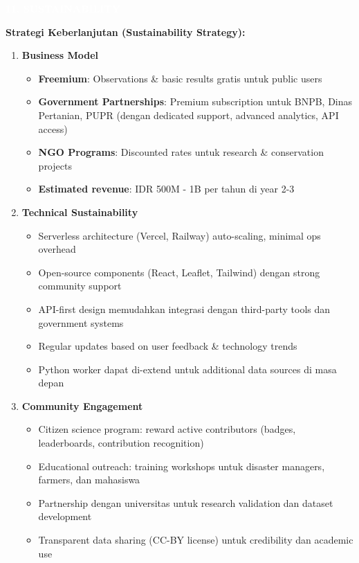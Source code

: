 \documentclass[12pt,a4paper]{article}
\newcommand{\sectionbox}[1]{%
  \colorbox{samsungblue}{%
    \parbox{\textwidth}{%
      \textcolor{white}{\large\bfseries #1}%
    }%
  }%
}
\newcommand{\subsectionbox}[1]{%
  \textbf{\large #1}\\[0.3cm]
}
\begin{document}
\vspace{1cm}

\sectionbox{11. SUSTAINABILITY}

\vspace{0.5cm}

\subsectionbox{Strategi Keberlanjutan (Sustainability Strategy):}

\begin{enumerate}
  \item \textbf{Business Model}
  \begin{itemize}
    \item \textbf{Freemium}: Observations \& basic results gratis untuk public users
    \item \textbf{Government Partnerships}: Premium subscription untuk BNPB, Dinas Pertanian, PUPR (dengan dedicated support, advanced analytics, API access)
    \item \textbf{NGO Programs}: Discounted rates untuk research \& conservation projects
    \item \textbf{Estimated revenue}: IDR 500M - 1B per tahun di year 2-3
  \end{itemize}

  \item \textbf{Technical Sustainability}
  \begin{itemize}
    \item Serverless architecture (Vercel, Railway) auto-scaling, minimal ops overhead
    \item Open-source components (React, Leaflet, Tailwind) dengan strong community support
    \item API-first design memudahkan integrasi dengan third-party tools dan government systems
    \item Regular updates based on user feedback \& technology trends
    \item Python worker dapat di-extend untuk additional data sources di masa depan
  \end{itemize}

  \item \textbf{Community Engagement}
  \begin{itemize}
    \item Citizen science program: reward active contributors (badges, leaderboards, contribution recognition)
    \item Educational outreach: training workshops untuk disaster managers, farmers, dan mahasiswa
    \item Partnership dengan universitas untuk research validation dan dataset development
    \item Transparent data sharing (CC-BY license) untuk credibility dan academic use
  \end{itemize}


\end{enumerate}
\end{document}
